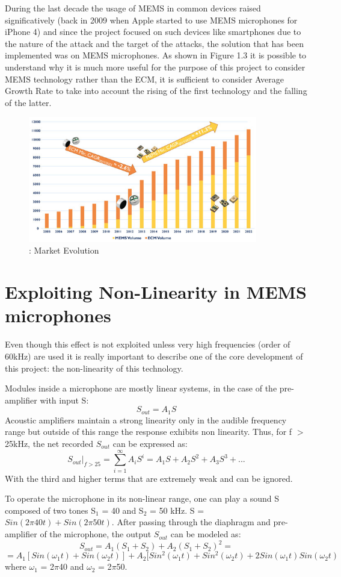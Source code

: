  During the last decade the usage of MEMS in common devices raised significatively (back in 2009 when Apple started to use MEMS microphones for iPhone 4) and since the project focused on such devices like smartphones due to the nature of the attack and the target of the attacks, the solution that has been implemented was on MEMS microphones.
 As shown in Figure 1.3 it is possible to understand why it is much more useful for the purpose of this project to consider MEMS technology rather than the ECM, it is sufficient to consider Average Growth Rate to take into account the rising of the first technology and the falling of the latter.

 
 \begin{figure}[H]
    \centering
    \includegraphics[width=10cm]{LiveAudioWatermarking/images/market.jpg}
    \caption{: Market Evolution}
    \label{fig:market}
\end{figure}

\section{Exploiting Non-Linearity in MEMS microphones}
Even though this effect is not exploited unless very high frequencies (order of 60kHz) are used it is really important to describe one of the core development of this project: the non-linearity of this technology.

Modules inside a microphone are mostly linear systems, in the case of the pre-amplifier with input S:
\[ S_{out} = A_1S\]
Acoustic amplifiers maintain a strong linearity only in the audible frequency range but outside of this range the response exhibits non linearity. Thus, for f $>$ 25kHz, the net recorded $S_{out}$ can be expressed as:
\[S_{out}\Bigg|_{f>25} = \sum_{i=1}^{\infty}A_iS^i=A_1S+A_2S^2+A_3S^3+...\]
With the third and higher terms that are extremely weak and can be ignored.

\newpage
To operate the microphone in its non-linear range, one can play a sound S composed of two tones S$_1$ = 40 and S$_2$ = 50 kHz.
S = $Sin(2\pi40t)+Sin(2\pi50t)$.
After passing through the diaphragm and pre-amplifier of the microphone, the output $S_{out}$ can be modeled as:
\[S_{out}= A_1(S_1 + S_2) + A_2(S_1 + S_2)^2 =\] \[ = A_1[Sin(\omega_1t) + Sin(\omega_2t)] + A_2 [Sin^2(\omega_1t) + Sin^2(\omega_2t) + 2Sin(\omega_1t)Sin(\omega_2t)\]
where $\omega_1$ = 2$\pi$40 and $\omega_2$ = 2$\pi$50.



